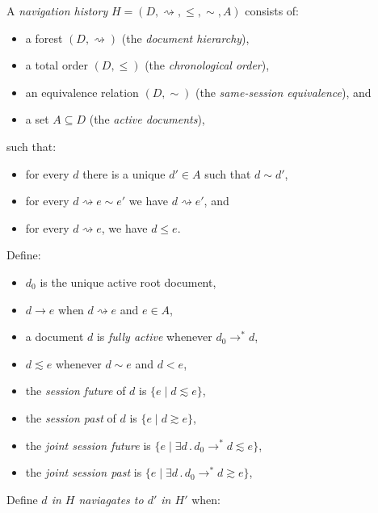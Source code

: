 \documentclass{article}
\newcommand{\aNH}{H}
\newcommand{\Docs}{D}
\newcommand{\Active}{A}
\newcommand{\parentOf}{\rightsquigarrow}
\newcommand{\parentOfActive}{\rightarrow}
\newcommand{\leChron}{\le}
\newcommand{\ltChron}{<}
\newcommand{\eqSess}{\sim}
\newcommand{\ltSess}{\lesssim}
\newcommand{\gtSess}{\gtrsim}
\newcommand{\rootDoc}{d_0}
\newcommand{\aDoc}{d}
\newcommand{\bDoc}{e}
\newcommand{\st}{\mathbin.}
\begin{document}
A \emph{navigation history} $\aNH=(\Docs,{\parentOf},{\leChron},{\eqSess},\Active)$ consists of:
\begin{itemize}
\item a forest $(\Docs,{\parentOf})$ (the \emph{document hierarchy}),
\item a total order $(\Docs,{\leChron})$ (the \emph{chronological order}),
\item an equivalence relation $(\Docs,{\eqSess})$ (the \emph{same-session equivalence}), and
\item a set $\Active \subseteq \Docs$ (the \emph{active documents}),
\end{itemize}
such that:
\begin{itemize}
\item for every $\aDoc$ there is a unique $\aDoc'\in\Active$ such that $\aDoc \eqSess \aDoc'$,
\item for every $\aDoc \parentOf \bDoc \eqSess \bDoc'$
  we have $\aDoc \parentOf \bDoc'$, and
\item for every $\aDoc \parentOf \bDoc$, we have $\aDoc \leChron \bDoc$.
\end{itemize}
Define:
\begin{itemize}
\item $\rootDoc$ is the unique active root document,
\item $\aDoc \parentOfActive \bDoc$ when $\aDoc \parentOf \bDoc$ and $\bDoc \in \Active$,
\item a document $\aDoc$ is \emph{fully active} whenever $\rootDoc \parentOfActive^* \aDoc$,
\item $\aDoc \ltSess \bDoc$ whenever $\aDoc \eqSess \bDoc$ and $\aDoc \ltChron \bDoc$,
\item the \emph{session future} of $\aDoc$ is $\{ \bDoc \mid \aDoc \ltSess \bDoc \}$,
\item the \emph{session past} of $\aDoc$ is $\{ \bDoc \mid \aDoc \gtSess \bDoc \}$,
\item the \emph{joint session future} is $\{ \bDoc \mid \exists \aDoc \st \rootDoc \parentOfActive^* \aDoc \ltSess \bDoc \}$,
\item the \emph{joint session past} is $\{ \bDoc \mid \exists \aDoc \st \rootDoc \parentOfActive^* \aDoc \gtSess \bDoc \}$,
\end{itemize}
Define \emph{$\aDoc$ in $\aNH$ naviagates to $\aDoc'$ in $\aNH'$} when:
\end{document}
